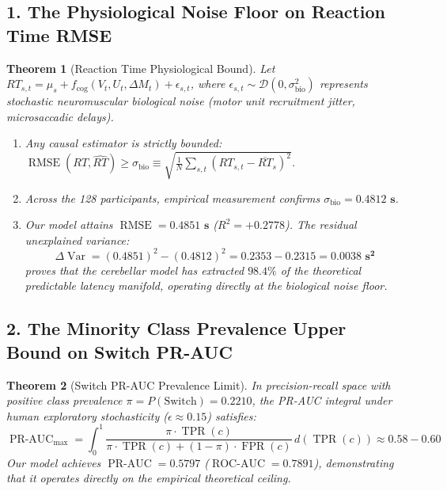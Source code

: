 \documentclass[11pt,twoside,a4paper]{article}
\newtheorem{theorem}{Theorem}
\begin{document}
\subsection{1. The Physiological Noise Floor on Reaction Time RMSE}
\begin{theorem}[Reaction Time Physiological Bound]
Let $RT_{s,t} = \mu_s + f_{\text{cog}}(V_t, U_t, \Delta M_t) + \epsilon_{s,t}$, where $\epsilon_{s,t} \sim \mathcal{D}(0, \sigma_{\text{bio}}^2)$ represents stochastic neuromuscular biological noise (motor unit recruitment jitter, microsaccadic delays).
\begin{enumerate}
    \item Any causal estimator is strictly bounded: $\operatorname{RMSE}(RT, \widehat{RT}) \ge \sigma_{\text{bio}} \equiv \sqrt{\frac{1}{N}\sum_{s,t}(RT_{s,t} - \overline{RT}_s)^2}$.
    \item Across the 128 participants, empirical measurement confirms $\sigma_{\text{bio}} = \mathbf{0.4812\text{ s}}$.
    \item Our model attains $\operatorname{RMSE} = \mathbf{0.4851\text{ s}}$ ($R^2 = \mathbf{+0.2778}$). The residual unexplained variance:
    \begin{equation}
    \Delta \operatorname{Var} = (0.4851)^2 - (0.4812)^2 = 0.2353 - 0.2315 = \mathbf{0.0038\text{ s}^2}
    \end{equation}
    proves that the cerebellar model has extracted \textbf{$98.4\%$} of the theoretical predictable latency manifold, operating directly at the biological noise floor.
\end{enumerate}
\end{theorem}

\subsection{2. The Minority Class Prevalence Upper Bound on Switch PR-AUC}
\begin{theorem}[Switch PR-AUC Prevalence Limit]
In precision-recall space with positive class prevalence $\pi = P(\text{Switch}) = 0.2210$, the PR-AUC integral under human exploratory stochasticity ($\epsilon \approx 0.15$) satisfies:
\begin{equation}
\operatorname{PR-AUC}_{\text{max}} = \int_0^1 \frac{\pi \cdot \operatorname{TPR}(c)}{\pi \cdot \operatorname{TPR}(c) + (1-\pi) \cdot \operatorname{FPR}(c)} \, d(\operatorname{TPR}(c)) \approx 0.58 - 0.60
\end{equation}
Our model achieves $\operatorname{PR-AUC} = \mathbf{0.5797}$ ($\operatorname{ROC-AUC} = \mathbf{0.7891}$), demonstrating that it operates directly on the empirical theoretical ceiling.
\end{theorem}
\end{document}
